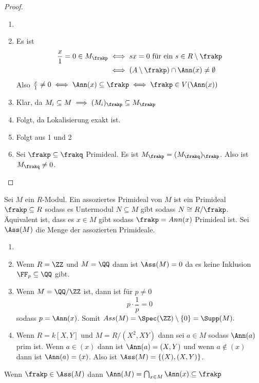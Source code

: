 \begin{proof}
	\begin{enumerate}
		\item[]
		\item Es ist \begin{align*}
			\frac x 1 =0  \in M_\frakp & \iff sx=0 \text{ für ein } s\in R\setminus\frakp\\
			& \iff (A\setminus\frakp)\cap\Ann(x)\neq\emptyset
		\end{align*}
		Also \(\frac x 1\neq 0 \iff \Ann(x)\subseteq\frakp \iff \frakp\in V(\Ann(x))\)
		\item Klar, da \(M_i\subseteq M\implies (M_i)_\frakp\subseteq M_\frakp\)
		\item Folgt, da Lokalisierung exakt ist.
		\item Folgt aus 1 und 2
		\item Sei \(\frakp\subseteq\frakq\) Primideal. Es ist \(M_\frakp=(M_\frakq)_\frakp\). Also ist \(M_\frakq\neq 0\).
	\end{enumerate}
\end{proof}
\begin{Def} Sei \(M\) ein \(R\)-Modul.
	Ein assoziertes Primideal von \(M\) ist ein Primideal \(\frakp\subseteq R\) sodass es Untermodul \(N\subseteq M\) gibt
	sodass \(N\cong R/\frakp\). Äquivalent ist, dass es \(x\in M\) gibt sodass \(\frakp=Ann(x)\) Primideal ist. Sei \(\Ass(M)\)
	die Menge der assozierten Primideale.
	
\end{Def}
\begin{Bsp}
	\begin{enumerate}
		\item[]
		\item Wenn \(R=\ZZ\) und \(M=\QQ\) dann ist \(\Ass(M)=0\) da es keine Inklusion \(\FF_p\subseteq \QQ\) gibt.
		\item Wenn \(M=\QQ/\ZZ\) ist, dann ist für \(p\neq 0\) \[p\cdot \frac 1 p =0\] sodass
		\(p=\Ann(x)\). Somit \(Ass(M)=\Spec(\ZZ)\setminus\{0\}=\Supp(M).\)
		\item Wenn \(R=k[X,Y]\) und \(M=R/(X^2,XY)\) dann sei \(a\in M\) sodass \(\Ann(a)\) prim ist.
		Wenn \(a\in (x)\) dann ist \(\Ann(a)=(X,Y)\) und wenn \(a\not\in (x)\) dann ist \(\Ann(a)=(x)\).
		Also ist \(\Ass(M)=\{(X),(X,Y)\}\).
\end{enumerate}\end{Bsp}
\begin{Bem} Wenn \(\frakp\in\Ass(M)\) dann \(\Ann(M)=\bigcap_{x\in M}\Ann(x)\subseteq\frakp\)
	
\end{Bem}
